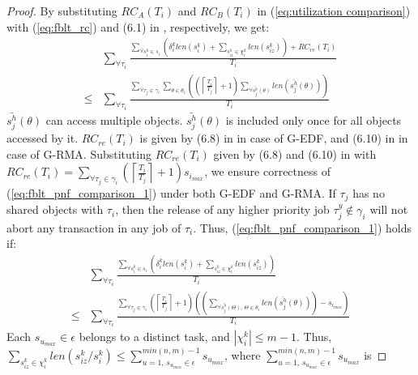 \documentclass[conference]{IEEEtran}
\begin{document}
\begin{proof}
By substituting $RC_{A}(T_{i})$ and $RC_{B}(T_{i})$ in (\ref{eq:utilization comparison})
with (\ref{eq:fblt_rc}) and (6.1) in \cite{shambake_phd_proposal}, 
respectively, we get:
\begin{eqnarray}
 & \sum_{\forall\tau_{i}}\frac{\sum_{\forall s_{i}^{k}\in s_{i}}\left(\delta_{i}^{k}len(s_{i}^{k})+\sum_{s_{iz}^{k}\in\chi_{i}^{k}}len(s_{iz}^{k})\right)+RC_{re}(T_{i})}{T_{i}}\nonumber\\
\le & \sum_{\forall\tau_{i}}\frac{\sum_{\forall\tau_{j}\in\gamma_{i}}\sum_{\theta\in\theta_{i}}\left(\left(\left\lceil \frac{T_{i}}{T_{j}}\right\rceil +1\right)\sum_{\forall\bar{s_{j}^{h}}(\theta)}len\left(\bar{s_{j}^{h}}(\theta)\right)\right)}{T_{i}}\label{eq:fblt_pnf_comparison_1} 
\end{eqnarray}
%
$\bar{s_{j}^{h}}(\theta)$ can access multiple objects. $\bar{s_{j}^{h}}(\theta)$
is included only once for all objects accessed by it. $RC_{re}(T_{i})$
is given by (6.8) in \cite{shambake_phd_proposal} in case of G-EDF,
and (6.10) in \cite{shambake_phd_proposal} in case of G-RMA. Substituting $RC_{re}(T_{i})$ given by (6.8) and (6.10) in \cite{shambake_phd_proposal} with $RC_{re}(T_{i})=\sum_{\forall\tau_{j}\in\gamma_{i}}\left(\left\lceil \frac{T_{i}}{T_{j}}\right\rceil +1\right)s_{i_{max}}$, we ensure correctness of (\ref{eq:fblt_pnf_comparison_1}) under both G-EDF and G-RMA. If $\tau_{j}$ has no shared objects with $\tau_{i}$, then the release of
any higher priority job $\tau_{j}^{y} \not \in \gamma_i$ will not abort any transaction
in any job of $\tau_{i}$. Thus, (\ref{eq:fblt_pnf_comparison_1}) holds
if:
\begin{eqnarray}
 & \sum_{\forall\tau_{i}}\frac{\sum_{\forall s_{i}^{k}\in s_{i}}\left(\delta_{i}^{k}len(s_{i}^{k})+\sum_{s_{iz}^{k}\in\chi_{i}^{k}}len(s_{iz}^{k})\right)}{T_{i}}\label{eq:fblt_pnf_comparison_1-1}\\
\le & \sum_{\forall\tau_{i}}\frac{\sum_{\forall\tau_{j}\in\gamma_{i}}\left(\left\lceil \frac{T_{i}}{T_{j}}\right\rceil +1\right)\left(\left(\sum_{\forall\bar{s_{j}^{h}}(\Theta),\,\Theta\in\theta_{i}}len\left(\bar{s_{j}^{h}}(\theta)\right)\right)-s_{i_{max}}\right)}{T_{i}}\nonumber
\end{eqnarray}
%
Each $s_{u_{max}}\in\epsilon$ belongs to a distinct task, and $|\chi_{i}^{k}|\le m-1$. Thus, $\sum_{s_{iz}^{k}\in\chi_{i}^{k}}len\left(s_{iz}^{k}/s_{i}^{k}\right)\le\sum_{u=1,\, s_{u_{max}}\in\epsilon}^{min(n,m)-1}s_{u_{max}}$, where $\sum_{u=1,\, s_{u_{max}}\in\epsilon}^{min(n,m)-1}s_{u_{max}}$ is

\end{proof}
\end{document}
